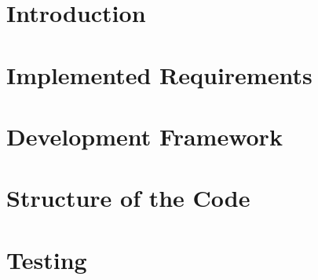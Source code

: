 \setcounter{page}{2}


\newpage
\tableofcontents
\newpage
{}
{}
\listoffigures
{}
{}
\listoftables

\clearpage
\section{Introduction}
\label{sect:introduction}


\clearpage
\section{Implemented Requirements}
\label{sect:requirements}


\clearpage
\section{Development Framework}
\label{sect:framework}


\clearpage
\section{Structure of the Code}
\label{sect:codestructure}


\clearpage
\section{Testing}
\label{sect:testing}


